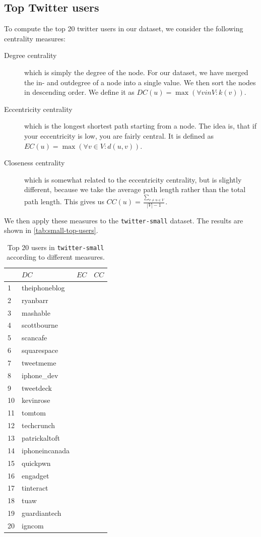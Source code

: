\documentclass[a4paper,10pt,hidelinks]{article}
\begin{document}
\subsection{Top Twitter users}
To compute the top 20 twitter users in our dataset, we consider the following centrality measures:

\begin{description}
	\item[Degree centrality] which is simply the degree of the node. For our dataset, we have merged the in- and outdegree of a node into a single value. We then sort the nodes in descending order. We define it as $DC(u) = \max(\forall v in V : k(v))$.

	\item[Eccentricity centrality] which is the longest shortest path starting from a node. The idea is, that if your eccentricity is low, you are fairly central. It is defined as $EC(u) = \max(\forall v \in V : d(u, v))$.

	\item[Closeness centrality] which is somewhat related to the eccentricity centrality, but is slightly different, because we take the average path length rather than the total path length. This gives us $CC(u) = \frac{\sum_{v \neq u \in V}}{|V| - 1}$.
\end{description}

We then apply these measures to the \texttt{twitter-small} dataset. The results are shown in \autoref{tab:small-top-users}.

\begin{table}
	\centering
	\begin{tabular}{l || l | l | l}
		& $DC$ & $EC$ & $CC$ \\
		\hline
		1 & theiphoneblog \\
		2 & ryanbarr \\
		3 & mashable \\
		4 & scottbourne \\
		5 & scancafe \\
		6 & squarespace \\
		7 & tweetmeme \\
		8 & iphone\_dev \\
		9 & tweetdeck \\
		10 & kevinrose \\
		11 & tomtom \\
		12 & techcrunch \\
		13 & patrickaltoft \\
		14 & iphoneincanada \\
		15 & quickpwn \\
		16 & engadget \\
		17 & tinteract \\
		18 & tuaw \\
		19 & guardiantech \\
		20 & igncom
	\end{tabular}
	\caption{Top 20 users in \texttt{twitter-small} according to different measures.}
	\label{tab:small-top-users}
\end{table}
\end{document}
